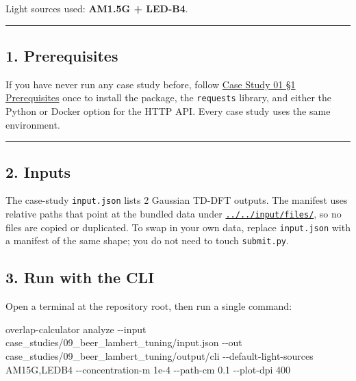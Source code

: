 \documentclass[
  11pt,
]{article}
\newenvironment{Shaded}{}{}
\newcommand{\AttributeTok}[1]{\textcolor[rgb]{0.49,0.56,0.16}{#1}}
\newcommand{\ExtensionTok}[1]{#1}
\newcommand{\NormalTok}[1]{#1}
\begin{document}
Light sources used: \textbf{AM1.5G + LED-B4}.

\begin{center}\rule{0.5\linewidth}{0.5pt}\end{center}

\hypertarget{1-prerequisites}{
\subsection{1. Prerequisites}\label{1-prerequisites}}

If you have never run any case study before, follow
\href{https://github.com/pinarsyt/overlap-calculator/blob/main/case_studies/01_theoretical_only/README.md\#1-prerequisites}{Case
Study 01 §1 Prerequisites} once to install the package, the
\texttt{requests} library, and either the Python or Docker option for
the HTTP API. Every case study uses the same environment.

\begin{center}\rule{0.5\linewidth}{0.5pt}\end{center}

\hypertarget{2-inputs}{
\subsection{2. Inputs}\label{2-inputs}}

The case-study \texttt{input.json} lists 2 Gaussian TD-DFT outputs. The
manifest uses relative paths that point at the bundled data under
\href{https://github.com/pinarsyt/overlap-calculator/blob/main/input/files}{\texttt{../../input/files/}},
so no files are copied or duplicated. To swap in your own data, replace
\texttt{input.json} with a manifest of the same shape; you do not need
to touch \texttt{submit.py}.

\hypertarget{3-run-with-the-cli}{
\subsection{3. Run with the CLI}\label{3-run-with-the-cli}}

Open a terminal at the repository root, then run a single command:

\begin{Shaded}
\begin{Highlighting}[]
\ExtensionTok{overlap{-}calculator}\NormalTok{ analyze }\AttributeTok{{-}{-}input}\NormalTok{ case\_studies/09\_beer\_lambert\_tuning/input.json }\AttributeTok{{-}{-}out}\NormalTok{ case\_studies/09\_beer\_lambert\_tuning/output/cli }\AttributeTok{{-}{-}default{-}light{-}sources}\NormalTok{ AM15G,LEDB4 }\AttributeTok{{-}{-}concentration{-}m}\NormalTok{ 1e{-}4 }\AttributeTok{{-}{-}path{-}cm}\NormalTok{ 0.1 }\AttributeTok{{-}{-}plot{-}dpi}\NormalTok{ 400}
\end{Highlighting}
\end{Shaded}
\end{document}
